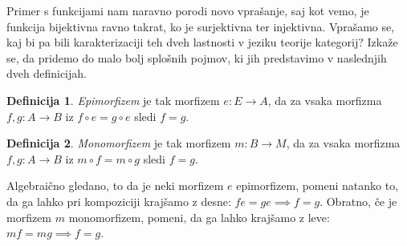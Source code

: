 \documentclass[12pt,a4paper]{book}
\theoremstyle{definition}
\newtheorem{definicija}{Definicija}[chapter]
\theoremstyle{plain}
\theoremstyle{definition}
\theoremstyle{remark}
\begin{document}
Primer s funkcijami nam naravno porodi novo vprašanje, saj kot vemo, je funkcija bijektivna ravno takrat, ko je surjektivna ter injektivna. Vprašamo se, kaj bi pa bili karakterizaciji teh dveh lastnosti v jeziku teorije kategorij? Izkaže se, da pridemo do malo bolj splošnih pojmov, ki jih predstavimo v naslednjih dveh definicijah.

\begin{definicija}
\emph{Epimorfizem} je tak morfizem $e : E \to A$, da za vsaka morfizma $f,g : A \to B$ iz $f \circ e = g \circ e$ sledi $f = g$.
\end{definicija}

\begin{definicija}
\emph{Monomorfizem} je tak morfizem $m : B \to M$, da za vsaka morfizma $f,g : A \to B$ iz $m \circ f = m \circ g$ sledi $f = g$.
\end{definicija}

Algebraično gledano, to da je neki morfizem $e$ epimorfizem, pomeni natanko to, da ga lahko pri kompoziciji krajšamo z desne: $fe = ge \implies f=g$. Obratno, če je morfizem $m$ monomorfizem, pomeni, da ga lahko krajšamo z leve: $mf = mg \implies f = g$.
\end{document}
